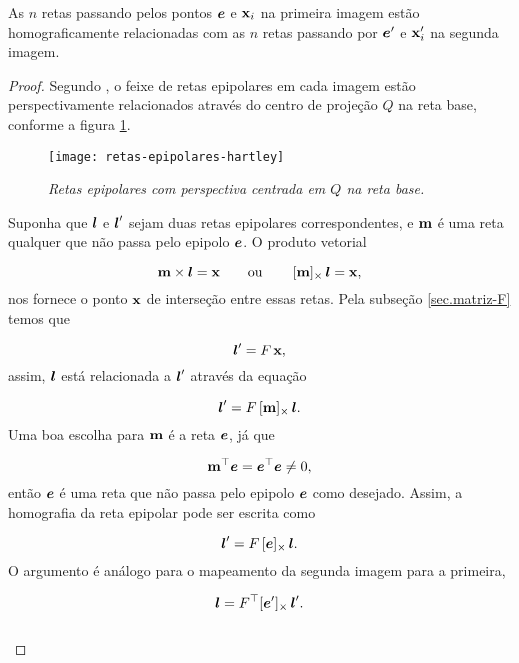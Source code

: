 \begin{teorema}
As $n$ retas passando pelos pontos $\boldsymbol{e}$ e $\mathbf{x}_i$ na primeira imagem estão homograficamente relacionadas com as $n$ retas passando por $\boldsymbol{e}'$ e $\mathbf{x}'_i$ na segunda imagem.
\end{teorema}

\begin{proof}
Segundo \cite{Hartley2004}, o feixe de retas epipolares em cada imagem estão perspectivamente relacionados através do centro de projeção $Q$ na reta base, conforme a figura \ref{fig.retas-epi-hartley}.

\begin{figure}[!htb]
\centering
\texttt{[image: retas-epipolares-hartley]}
\caption{\textit{Retas epipolares com perspectiva centrada em $Q$ na reta base.}}
\label{fig.retas-epi-hartley}
\end{figure}


Suponha que $\boldsymbol{l}$ e $\boldsymbol{l}'$ sejam duas retas epipolares correspondentes, e ${\bf m}$ é uma reta qualquer que não passa pelo epipolo $\boldsymbol{e}$. O produto vetorial 

\begin{equation}
{\bf m}\times\boldsymbol{l}=\mathbf{x}\qquad\text{ou}\qquad\,[{\bf m}]_\times\,\boldsymbol{l}=\mathbf{x},
\end{equation}
nos fornece o ponto $\mathbf{x}$ de interseção entre essas retas. Pela subseção \ref{sec.matriz-F} temos que

\begin{equation*}
\boldsymbol{l}'=F\,\mathbf{x},
\end{equation*} 
assim, $\boldsymbol{l}$ está relacionada a $\boldsymbol{l}'$ através da equação 

\begin{equation*}
\boldsymbol{l}'=F\,[{\bf m}]_\times\,\boldsymbol{l}.
\end{equation*}
Uma boa escolha para ${\bf m}$ é a reta $\boldsymbol{e}$, já que

\begin{equation*}
{\bf m}^\top\boldsymbol{e}=\boldsymbol{e}^\top\boldsymbol{e}\neq0,
\end{equation*}
então $\boldsymbol{e}$ é uma reta que não passa pelo epipolo $\boldsymbol{e}$ como desejado. Assim, a homografia da reta epipolar pode ser escrita como 

\begin{equation*}
\boldsymbol{l}'=F\,[\boldsymbol{e}]_\times\,\boldsymbol{l}.
\end{equation*}
O argumento é análogo para o mapeamento da segunda imagem para a primeira,

\begin{equation*}
\boldsymbol{l}=F^\top [\boldsymbol{e}']_\times\,\boldsymbol{l}'.
\end{equation*}\\


\end{proof}


